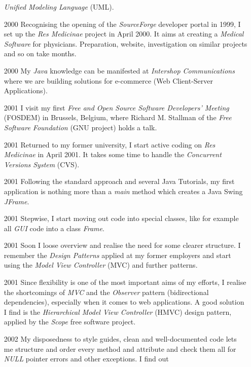 \begin{itemize}
        \emph{Unified Modeling Language} (UML).
    \item[2000] Recognising the opening of the \emph{SourceForge} developer
        portal in 1999, I set up the \emph{Res Medicinae} project in April 2000.
        It aims at creating a \emph{Medical Software} for physicians.
        Preparation, website, investigation on similar projects and so on take
        months.
    \item[2000] My \emph{Java} knowledge can be manifested at
        \emph{Intershop Communications} where we are building solutions for
        e-commerce (Web Client-Server Applications).
    \item[2001] I visit my first \emph{Free and Open Source Software Developers'
        Meeting} (FOSDEM) in Brussels, Belgium, where Richard M. Stallman of
        the \emph{Free Software Foundation} (GNU project) holds a talk.
    \item[2001] Returned to my former university, I start active coding on
        \emph{Res Medicinae} in April 2001. It takes some time to handle the
        \emph{Concurrent Versions System} (CVS).
    \item[2001] Following the standard approach and several Java Tutorials,
        my first application is nothing more than a \emph{main} method which
        creates a Java Swing \emph{JFrame}.
    \item[2001] Stepwise, I start moving out code into special classes, like
        for example all \emph{GUI} code into a class \emph{Frame}.
    \item[2001] Soon I loose overview and realise the need for some clearer
        structure. I remember the \emph{Design Patterns} applied at my former
        employers and start using the \emph{Model View Controller} (MVC) and
        further patterns.
    \item[2001] Since flexibility is one of the most important aims of my
        efforts, I realise the shortcomings of \emph{MVC} and the
        \emph{Observer} pattern (bidirectional dependencies), especially when
        it comes to web applications. A good solution I find is the
        \emph{Hierarchical Model View Controller} (HMVC) design pattern,
        applied by the \emph{Scope} free software project.
    \item[2002] My disposedness to style guides, clean and well-documented code
        lets me structure and order every method and attribute and check them
        all for \emph{NULL} pointer errors and other exceptions. I find out

\end{itemize}
